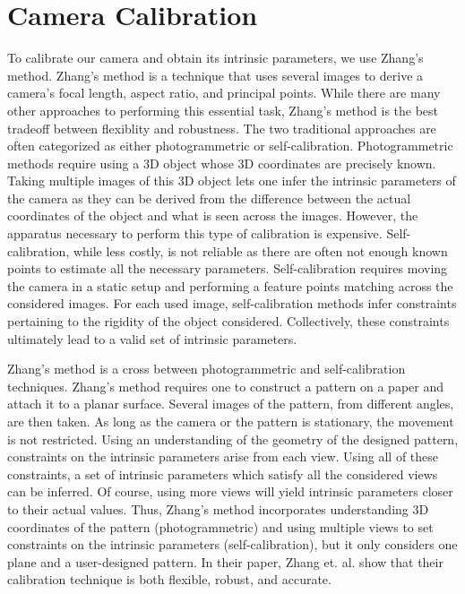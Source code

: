 \section{Camera Calibration}
\label{s:camera}

To calibrate our camera and obtain its intrinsic parameters, we use Zhang’s method. 
Zhang’s method is a technique that uses several images to derive a camera’s focal length, aspect ratio, and principal points. While there are many other approaches to performing this essential task, Zhang’s method is the best tradeoff between flexiblity and robustness. The two traditional approaches are often categorized as either photogrammetric or self-calibration. Photogrammetric methods require using a 3D object whose 3D coordinates are precisely known. Taking multiple images of this 3D object lets one infer the intrinsic parameters of the camera as they can be derived from the difference between the actual coordinates of the object and what is seen across the images. However, the apparatus necessary to perform this type of calibration is expensive. Self-calibration, while less costly, is not reliable as there are often not enough known points to estimate all the necessary parameters. Self-calibration requires moving the camera in a static setup and performing a feature points matching across the considered images. For each used image, self-calibration methods infer constraints pertaining to the rigidity of the object considered. Collectively, these constraints ultimately lead to a valid set of intrinsic parameters. 

Zhang’s method is a cross between photogrammetric and self-calibration techniques. Zhang’s method requires one to construct a pattern on a paper and attach it to a planar surface. Several images of the pattern, from different angles, are then taken. As long as the camera or the pattern is stationary, the movement is not restricted. Using an understanding of the geometry of the designed pattern, constraints on the intrinsic parameters arise from each view. Using all of these constraints, a set of intrinsic parameters which satisfy all the considered views can be inferred. Of course, using more views will yield intrinsic parameters closer to their actual values. Thus, Zhang’s method incorporates understanding 3D coordinates of the pattern  (photogrammetric) and using multiple views to set constraints on the intrinsic parameters (self-calibration), but it only considers one plane and a user-designed pattern. In their paper, Zhang et. al. show that their calibration technique is both flexible, robust, and accurate. 

